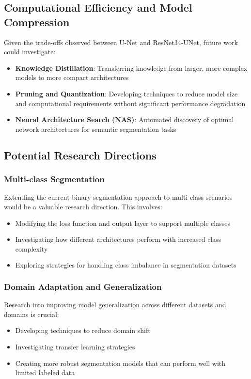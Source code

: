 \documentclass[twocolumn,a4paper]{article}
\begin{document}
\subsection{Computational Efficiency and Model Compression}
Given the trade-offs observed between U-Net and ResNet34-UNet, future work could investigate:
\begin{itemize}
    \item \textbf{Knowledge Distillation}: Transferring knowledge from larger, more complex models to more compact architectures
    \item \textbf{Pruning and Quantization}: Developing techniques to reduce model size and computational requirements without significant performance degradation
    \item \textbf{Neural Architecture Search (NAS)}: Automated discovery of optimal network architectures for semantic segmentation tasks
\end{itemize}

\subsection{Potential Research Directions}
\subsubsection{Multi-class Segmentation}
Extending the current binary segmentation approach to multi-class scenarios would be a valuable research direction. This involves:
\begin{itemize}
    \item Modifying the loss function and output layer to support multiple classes
    \item Investigating how different architectures perform with increased class complexity
    \item Exploring strategies for handling class imbalance in segmentation datasets
\end{itemize}

\subsubsection{Domain Adaptation and Generalization}
Research into improving model generalization across different datasets and domains is crucial:
\begin{itemize}
    \item Developing techniques to reduce domain shift
    \item Investigating transfer learning strategies
    \item Creating more robust segmentation models that can perform well with limited labeled data
\end{itemize}
\end{document}
